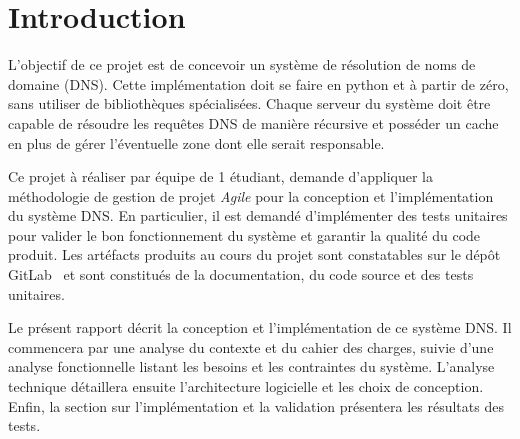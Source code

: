 \section*{Introduction}
L'objectif de ce projet est de concevoir un système de résolution de noms de domaine (DNS).
Cette implémentation doit se faire en python et à partir de zéro, sans utiliser de bibliothèques spécialisées.
Chaque serveur du système doit être capable de résoudre les requêtes DNS de manière récursive et posséder un cache en plus de gérer l'éventuelle zone dont elle serait responsable.

Ce projet à réaliser par équipe de 1 étudiant, demande d'appliquer la méthodologie de gestion de projet \textit{Agile} pour la conception et l'implémentation du système DNS.
En particulier, il est demandé d'implémenter des tests unitaires pour valider le bon fonctionnement du système et garantir la qualité du code produit.
Les artéfacts produits au cours du projet sont constatables sur le dépôt GitLab~\cite{gitlab_dns_project} et sont constitués de la documentation, du code source et des tests unitaires.

Le présent rapport décrit la conception et l'implémentation de ce système DNS.
Il commencera par une analyse du contexte et du cahier des charges, suivie d'une analyse fonctionnelle listant les besoins et les contraintes du système.
L'analyse technique détaillera ensuite l'architecture logicielle et les choix de conception.
Enfin, la section sur l'implémentation et la validation présentera les résultats des tests.